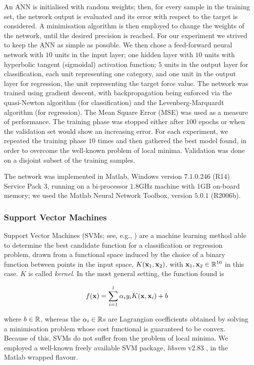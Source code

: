 An ANN is initialised with random weights; then, for every sample in
the training set, the network output is evaluated and its error with
respect to the target is considered. A minimisation algorithm is then
employed to change the weights of the network, until the desired
precision is reached. For our experiment we strived to keep the ANN as
simple as possible. We then chose a feed-forward neural network with
$10$ units in the input layer; one hidden layer with $10$ units with
hyperbolic tangent (sigmoidal) activation function; $5$ units in the
output layer for classification, each unit representing one category,
and one unit in the output layer for regression, the unit representing
the target force value. The network was trained using gradient
descent, with backpropagation being enforced via the quasi-Newton
algorithm (for classification) and the Levenberg-Marquardt algorithm
(for regression). The Mean Square Error (MSE) was used as a measure of
performance. The training phase was stopped either after $100$ epochs
or when the validation set would show an increasing error. For each
experiment, we repeated the training phase $10$ times and then
gathered the best model found, in order to overcome the well-known
problem of local minima. Validation was done on a disjoint subset of
the training samples.

The network was implemented in Matlab, Windows version $7.1.0.246$
(R14) Service Pack 3, running on a bi-processor $1.8$GHz machine with
1GB on-board memory; we used the Matlab Neural Network Toolbox,
version $5.0.1$ (R2006b).

\subsubsection{Support Vector Machines}

Support Vector Machines (SVMs; see, e.g.,
\cite{BGV92,Burges98,Cristianini00}) are a machine learning method
able to determine the best candidate function for a classification or
regression problem, drawn from a functional space induced by the
choice of a binary function between points in the input space,
$K(\mathbf{x}_1,\mathbf{x}_2)$, with $\mathbf{x}_1, \mathbf{x}_2 \in \mathbb{R}^{10}$ in this case. $K$
is called \emph{kernel}. In the most general setting, the function
found is

\begin{equation} \label{eqn:sol}
  f(\xx) = \sum_{i=1}^l \alpha_i y_i K(\xx,\xx_i) + b
\end{equation}

\noindent where $b \in \mathbb{R}$, whereas the $\alpha_i \in \mathbb{R}$s are
Lagrangian coefficients obtained by solving a minimisation problem
whose cost functional is guaranteed to be convex. Because of this,
SVMs do not suffer from the problem of local minima. We employed a
well-known freely available SVM package, \emph{libsvm} v2.83
\cite{ChangL01}, in the Matlab wrapped flavour.

